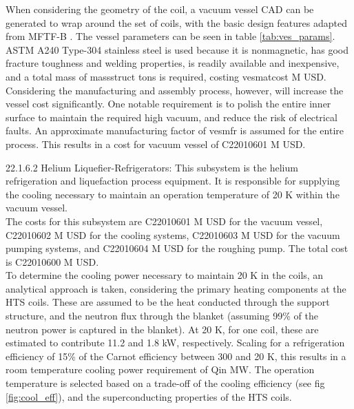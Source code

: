 When considering the geometry of the coil, a vacuum vessel CAD can be generated to wrap around the set of coils, with the basic design features adapted from MFTF-B \cite{gerich1986design}. The vessel parameters can be seen in table \ref{tab:ves_params}. ASTM A240 Type-304 stainless steel is used because it is nonmagnetic, has good fracture toughness and welding properties, is readily available and inexpensive, and a total mass of massstruct tons is required, costing vesmatcost M USD. Considering the manufacturing and assembly process, however, will increase the vessel cost significantly. One notable requirement is to polish the entire inner surface to maintain the required high vacuum, and reduce the risk of electrical faults. An approximate manufacturing factor of vesmfr is assumed for the entire process. This results in a cost for vacuum vessel of C22010601 M USD.


\begin{table}[h]
    \centering
    \caption{Vacuum vessel parameters.}
    \label{tab:ves_params}
\end{table}



22.1.6.2 Helium Liquefier-Refrigerators: This subsystem is the helium refrigeration and liquefaction process equipment. It is responsible for supplying the cooling necessary to maintain an operation temperature of 20 K within the vacuum vessel. \\

The costs for this subsystem are C22010601 M USD for the vacuum vessel, C22010602 M USD for the cooling systems, C22010603 M USD for the vacuum pumping systems, and C22010604 M USD for the roughing pump. The total cost is C22010600 M USD.\\

To determine the cooling power necessary to maintain 20 K in the coils, an analytical approach is taken, considering the primary heating components at the HTS coils. These are assumed to be the heat conducted through the support structure, and the neutron flux through the blanket (assuming 99\% of the neutron power is captured in the blanket). At 20 K, for one coil, these are estimated to contribute 11.2 and 1.8 kW, respectively. Scaling for a refrigeration efficiency of 15\% of the Carnot efficiency between 300 and 20 K, this results in a room temperature cooling power requirement of Qin MW. The operation temperature is selected based on a trade-off of the cooling efficiency (see fig \ref{fig:cool_eff}), and the superconducting properties of the HTS coils.\\

